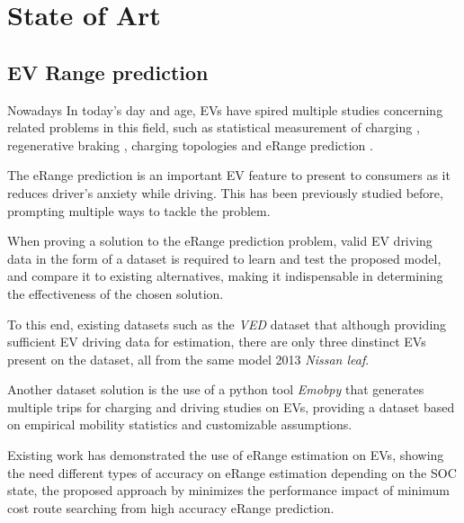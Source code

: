 \chapter{State of Art}
\label{cha:stateOfArt}

\section{EV Range prediction} 
\label{sec:stateOfArtER}

Nowadays In today's day and age, 
\glspl{EV} have spired multiple studies
concerning related problems in this field,
such as statistical measurement of charging \citep{EVScout2},
regenerative braking \citep{regenerativeBraking},
charging topologies \citep{batteryChargerTopologies} 
and \gls{eRange} prediction \citep{predictionOfeRange}.

The \gls{eRange} prediction is an important 
\gls{EV} feature to present to consumers as
it reduces driver's anxiety while driving.
This has been previously studied before,
prompting multiple ways to tackle the problem.

When proving a solution to the \gls{eRange}
prediction problem, valid \gls{EV} driving data 
in the form of a \gls{dataset} is required to 
learn and test the proposed model,
and compare it to existing alternatives, 
making it indispensable in determining the
effectiveness of the chosen solution.

To this end, existing \glspl{dataset}
such as the \textit{VED} \gls{dataset} \citep{vedDataset}
that although providing sufficient \gls{EV} driving
data for estimation, there are only three dinstinct 
\glspl{EV} present on the \gls{dataset}, all from the 
same model 2013 \textit{Nissan leaf}.


Another \gls{dataset} solution is the use of 
a \gls{python} tool \textit{Emobpy} \citep{emobpy}
that generates multiple trips for charging and driving
studies on \glspl{EV}, providing a \gls{dataset}
based on empirical mobility statistics and 
customizable assumptions.


Existing work has demonstrated the use of
\gls{eRange} estimation on \glspl{EV}, showing the need
different types of accuracy on \gls{eRange}
estimation depending on the \gls{SOC} state,
the proposed approach by \cite{eRange}
minimizes the performance impact
of minimum cost route searching from high accuracy
\gls{eRange} prediction.

